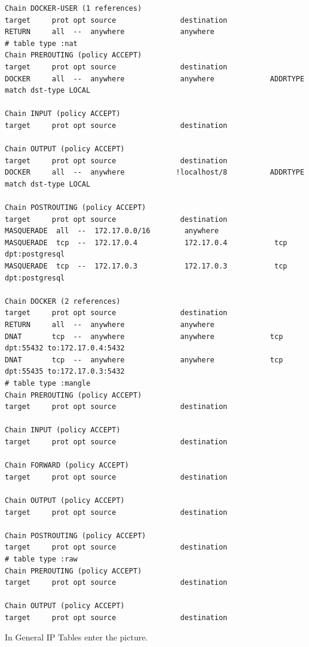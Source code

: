 \documentclass[letter,11pt,oneside]{article}
\begin{document}
\begin{tcolorbox}[breakable]
\begin{verbatim}
Chain DOCKER-USER (1 references)
target     prot opt source               destination         
RETURN     all  --  anywhere             anywhere            
# table type :nat
Chain PREROUTING (policy ACCEPT)
target     prot opt source               destination         
DOCKER     all  --  anywhere             anywhere             ADDRTYPE match dst-type LOCAL

Chain INPUT (policy ACCEPT)
target     prot opt source               destination         

Chain OUTPUT (policy ACCEPT)
target     prot opt source               destination         
DOCKER     all  --  anywhere            !localhost/8          ADDRTYPE match dst-type LOCAL

Chain POSTROUTING (policy ACCEPT)
target     prot opt source               destination         
MASQUERADE  all  --  172.17.0.0/16        anywhere            
MASQUERADE  tcp  --  172.17.0.4           172.17.0.4           tcp dpt:postgresql
MASQUERADE  tcp  --  172.17.0.3           172.17.0.3           tcp dpt:postgresql

Chain DOCKER (2 references)
target     prot opt source               destination         
RETURN     all  --  anywhere             anywhere            
DNAT       tcp  --  anywhere             anywhere             tcp dpt:55432 to:172.17.0.4:5432
DNAT       tcp  --  anywhere             anywhere             tcp dpt:55435 to:172.17.0.3:5432
# table type :mangle
Chain PREROUTING (policy ACCEPT)
target     prot opt source               destination         

Chain INPUT (policy ACCEPT)
target     prot opt source               destination         

Chain FORWARD (policy ACCEPT)
target     prot opt source               destination         

Chain OUTPUT (policy ACCEPT)
target     prot opt source               destination         

Chain POSTROUTING (policy ACCEPT)
target     prot opt source               destination         
# table type :raw
Chain PREROUTING (policy ACCEPT)
target     prot opt source               destination         

Chain OUTPUT (policy ACCEPT)
target     prot opt source               destination         
\end{verbatim}
\endgroup
\end{tcolorbox}


In General IP Tables enter the picture.
\end{document}
